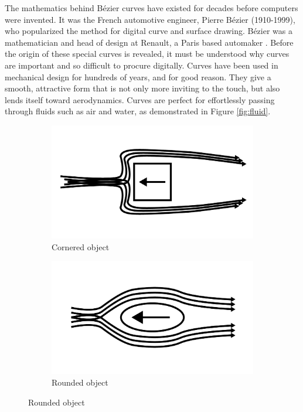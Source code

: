 \documentclass[12pt,letterpaper]{article}
\begin{document}
The mathematics behind Bézier curves have existed for decades before computers were invented. It was the French automotive engineer, Pierre Bézier (1910-1999), who popularized the method for digital curve and surface drawing. B\'ezier was a mathematician and head of design at Renault, a Paris based automaker \citep{handbook}. Before the origin of these special curves is revealed, it must be understood why curves are important and so difficult to procure digitally.
Curves have been used in mechanical design for hundreds of years, and for good reason. They give a smooth, attractive form that is not only more inviting to the touch, but also lends itself toward aerodynamics. Curves are perfect for effortlessly passing through fluids such as air and water, as demonstrated in Figure \ref{fig:fluid}.

\begin{figure}[H]
    \begin{center}
    \caption{Fluid is redirected harshly around a cornered object relative to a rounded object.}
    \label{fig:fluid}
    \begin{subfigure}[b]{.4\linewidth}
        \includegraphics[width=\linewidth]{aero-square}
        \caption{Cornered object}
    \end{subfigure}
    \begin{subfigure}[b]{.4\linewidth}
        \includegraphics[width=\linewidth]{aero-curve}
        \caption{Rounded object}
    \end{subfigure}
\end{center}
\end{figure}
\end{document}
